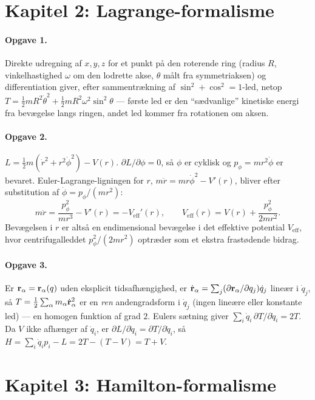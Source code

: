 \section*{Kapitel 2: Lagrange-formalisme}

\paragraph{Opgave 1.} Direkte udregning af $x,y,z$ for et punkt på
den roterende ring (radius $R$, vinkelhastighed $\omega$ om den
lodrette akse, $\theta$ målt fra symmetriaksen) og differentiation
giver, efter sammentrækning af $\sin^2+\cos^2=1$-led, netop
$T=\frac12mR^2\dot\theta^2+\frac12mR^2\omega^2\sin^2\theta$ — første
led er den ``sædvanlige'' kinetiske energi fra bevægelse langs
ringen, andet led kommer fra rotationen om aksen.

\paragraph{Opgave 2.} $L=\frac12m(\dot r^2+r^2\dot\phi^2)-V(r)$.
$\partial L/\partial\phi=0$, så $\phi$ er cyklisk og
$p_\phi=mr^2\dot\phi$ er bevaret. Euler-Lagrange-ligningen for $r$,
$m\ddot r = mr\dot\phi^2 - V'(r)$, bliver efter substitution af
$\dot\phi=p_\phi/(mr^2)$:
\begin{equation*}
  m\ddot r = \frac{p_\phi^2}{mr^3} - V'(r) = -V_\text{eff}'(r),
  \qquad V_\text{eff}(r)=V(r)+\frac{p_\phi^2}{2mr^2}.
\end{equation*}
Bevægelsen i $r$ er altså en endimensional bevægelse i det effektive
potential $V_\text{eff}$, hvor centrifugalleddet $p_\phi^2/(2mr^2)$
optræder som et ekstra frastødende bidrag.

\paragraph{Opgave 3.} Er $\vb{r}_\alpha=\vb{r}_\alpha(q)$ uden
eksplicit tidsafhængighed, er $\dot{\vb{r}}_\alpha=\sum_j(\partial\vb{r}_\alpha/\partial q_j)\dot q_j$
lineær i $\dot q_j$, så $T=\frac12\sum_\alpha m_\alpha\dot{\vb{r}}_\alpha^2$
er en \emph{ren} andengradsform i $\dot q_j$ (ingen lineære eller
konstante led) — en homogen funktion af grad $2$. Eulers sætning giver
$\sum_i\dot q_i\,\partial T/\partial\dot q_i=2T$. Da $V$ ikke afhænger
af $\dot q_i$, er $\partial L/\partial\dot q_i=\partial T/\partial\dot q_i$,
så $H=\sum_i\dot q_ip_i-L=2T-(T-V)=T+V$.

\section*{Kapitel 3: Hamilton-formalisme}

